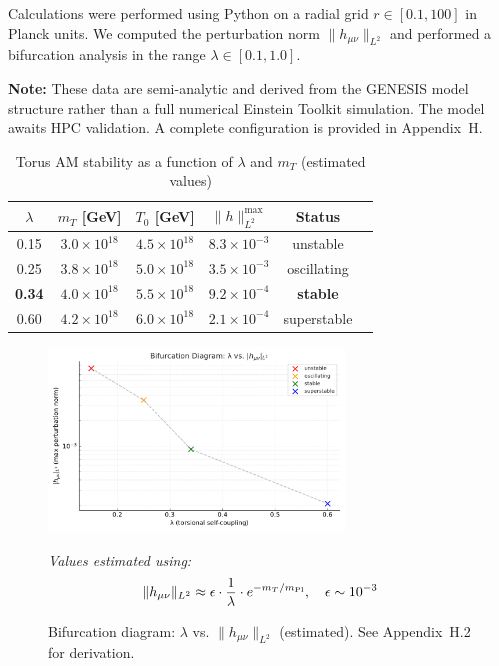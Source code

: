 \documentclass{article}
\begin{document}
Calculations were performed using Python on a radial grid $r \in [0.1, 100]$ in Planck units. We computed the perturbation norm $\|h_{\mu\nu}\|_{L^2}$ and performed a bifurcation analysis in the range $\lambda \in [0.1, 1.0]$.

\textbf{Note:} These data are semi-analytic and derived from the GENESIS model structure rather than a full numerical Einstein Toolkit simulation. The model awaits HPC validation. A complete configuration is provided in Appendix~H.

\begin{table}[h!]
\centering
\caption{Torus AM stability as a function of $\lambda$ and $m_T$ (estimated values)}
\label{tab:bifurcation}
\begin{tabular}{cccccc}
\toprule
$\lambda$ & $m_T$ [GeV] & $T_0$ [GeV] & $\|h\|_{L^2}^{\text{max}}$ & Status \\
\midrule
0.15 & $3.0\times10^{18}$ & $4.5\times10^{18}$ & $8.3\times10^{-3}$ & unstable \\
0.25 & $3.8\times10^{18}$ & $5.0\times10^{18}$ & $3.5\times10^{-3}$ & oscillating \\
\textbf{0.34} & $4.0\times10^{18}$ & $5.5\times10^{18}$ & $9.2\times10^{-4}$ & \textbf{stable} \\
0.60 & $4.2\times10^{18}$ & $6.0\times10^{18}$ & $2.1\times10^{-4}$ & superstable \\
\bottomrule
\end{tabular}
\end{table}

\begin{figure}[h!]
\centering
\includegraphics[width=0.7\textwidth]{bifurkacja_diagram.pdf}
\caption{Bifurcation diagram: $\lambda$ vs. $\|h_{\mu\nu}\|_{L^2}$ (estimated). See Appendix~H.2 for derivation.}
\label{fig:bifurcation}
\vspace{0.2cm}
\noindent \textit{Values estimated using:}
\[
\|h_{\mu\nu}\|_{L^2} \approx \epsilon \cdot \frac{1}{\lambda} \cdot e^{-m_T / m_{\rm Pl}}, \quad \epsilon \sim 10^{-3}
\]
\end{figure}
\end{document}
